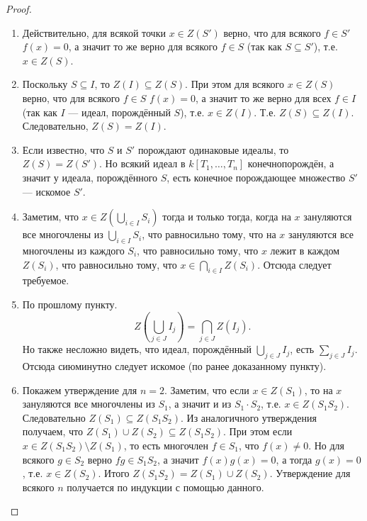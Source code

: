 \documentclass[12pt,a4paper]{article}
\begin{document}
    \begin{proof}
        \begin{enumerate}
            \item Действительно, для всякой точки $x \in Z(S')$ верно, что для всякого $f \in S'$ $f(x) = 0$, а значит то же верно для всякого $f \in S$ (так как $S \subseteq S'$), т.е. $x \in Z(S)$.

            \item Поскольку $S \subseteq I$, то $Z(I) \subseteq Z(S)$. При этом для всякого $x \in Z(S)$ верно, что для всякого $f \in S$ $f(x) = 0$, а значит то же верно для всех $f \in I$ (так как $I$ --- идеал, порождённый $S$), т.е. $x \in Z(I)$. Т.е. $Z(S) \subseteq Z(I)$. Следовательно, $Z(S) = Z(I)$.

            \item Если известно, что $S$ и $S'$ порождают одинаковые идеалы, то $Z(S) = Z(S')$. Но всякий идеал в $k[T_1, \dots, T_n]$ конечнопорождён, а значит у идеала, порождённого $S$, есть конечное порождающее множество $S'$ --- искомое $S'$.

            \item Заметим, что $x \in Z(\bigcup_{i \in I} S_i)$ тогда и только тогда, когда на $x$ зануляются все многочлены из $\bigcup_{i \in I} S_i$, что равносильно тому, что на $x$ зануляются все многочлены из каждого $S_i$, что равносильно тому, что $x$ лежит в каждом $Z(S_i)$, что равносильно тому, что $x \in \bigcap_{i \in I} Z(S_i)$. Отсюда следует требуемое.

            \item По прошлому пункту.
                \[Z\left(\bigcup_{j \in J} I_j\right) = \bigcap_{j \in J} Z(I_j).\]
                Но также несложно видеть, что идеал, порождённый $\bigcup_{j \in J} I_j$, есть $\sum_{j \in J} I_j$. Отсюда сиюминутно следует искомое (по ранее доказанному пункту).

            \item Покажем утверждение для $n = 2$. Заметим, что если $x \in Z(S_1)$, то на $x$ зануляются все многочлены из $S_1$, а значит и из $S_1 \cdot S_2$, т.е. $x \in Z(S_1 S_2)$. Следовательно $Z(S_1) \subseteq Z(S_1 S_2)$. Из аналогичного утверждения получаем, что $Z(S_1) \cup Z(S_2) \subseteq Z(S_1 S_2)$. При этом если $x \in Z(S_1 S_2) \setminus Z(S_1)$, то есть многочлен $f \in S_1$, что $f(x) \neq 0$. Но для всякого $g \in S_2$ верно $fg \in S_1 S_2$, а значит $f(x)g(x) = 0$, а тогда $g(x) = 0$, т.е. $x \in Z(S_2)$. Итого $Z(S_1 S_2) = Z(S_1) \cup Z(S_2)$. Утверждение для всякого $n$ получается по индукции с помощью данного.


\end{enumerate}
\end{proof}
\end{document}
